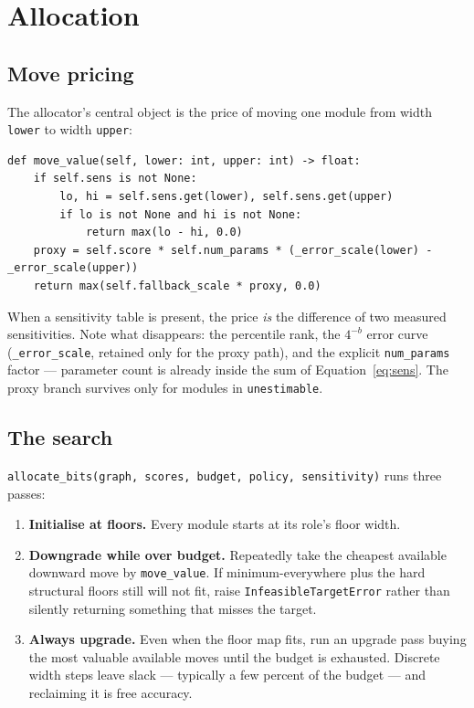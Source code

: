\documentclass[11pt]{article}
\newcommand{\code}[1]{\texttt{#1}}
\begin{document}
\section{Allocation}
\label{sec:alloc}

\subsection{Move pricing}

The allocator's central object is the price of moving one module from width \code{lower} to
width \code{upper}:

\begin{verbatim}
def move_value(self, lower: int, upper: int) -> float:
    if self.sens is not None:
        lo, hi = self.sens.get(lower), self.sens.get(upper)
        if lo is not None and hi is not None:
            return max(lo - hi, 0.0)
    proxy = self.score * self.num_params * (_error_scale(lower) - _error_scale(upper))
    return max(self.fallback_scale * proxy, 0.0)
\end{verbatim}

When a sensitivity table is present, the price \emph{is} the difference of two measured
sensitivities. Note what disappears: the percentile rank, the $4^{-b}$ error curve
(\code{\_error\_scale}, retained only for the proxy path), and the explicit \code{num\_params}
factor --- parameter count is already inside the sum of Equation~\ref{eq:sens}. The proxy branch
survives only for modules in \code{unestimable}.

\subsection{The search}

\code{allocate\_bits(graph, scores, budget, policy, sensitivity)} runs three passes:

\begin{enumerate}
\item \textbf{Initialise at floors.} Every module starts at its role's floor width.
\item \textbf{Downgrade while over budget.} Repeatedly take the cheapest available downward move
by \code{move\_value}. If minimum-everywhere plus the hard structural floors still will not fit,
raise \code{InfeasibleTargetError} rather than silently returning something that misses the
target.
\item \textbf{Always upgrade.} Even when the floor map fits, run an upgrade pass buying the
most valuable available moves until the budget is exhausted. Discrete width steps leave slack
--- typically a few percent of the budget --- and reclaiming it is free accuracy.
\end{enumerate}
\end{document}
